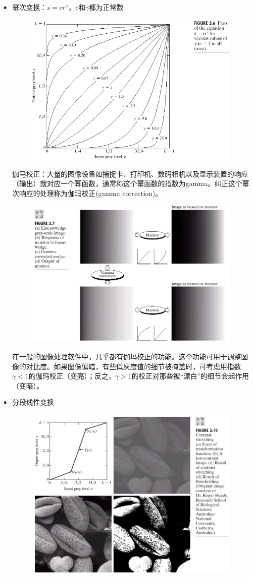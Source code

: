 \begin{itemize}
\begin{figure}[H]
\end{figure}
\item 幂次变换：$s=cr^\gamma$，$c$和$\gamma$都为正常数
\begin{figure}[H]
\centering
\includegraphics[width=0.6\linewidth]{fig/trans-power.png}
\end{figure}
伽马校正：大量的图像设备如捕捉卡、打印机、数码相机以及显示装置的响应（输出）就对应一个幂函数，通常称这个幂函数的指数为gamma。纠正这个幂次响应的处理称为伽玛校正(gamma correction)。
\begin{figure}[H]
\centering
\includegraphics[width=0.6\linewidth]{fig/trans-gamma.png}
\end{figure}
在一般的图像处理软件中，几乎都有伽玛校正的功能。这个功能可用于调整图像的对比度。如果图像偏暗，有些低灰度值的细节被掩盖时，可考虑用指数$\gamma<1$的伽玛校正（变亮）；反之，$\gamma>1$的校正对那些被“漂白”的细节会起作用（变暗）。
\item 分段线性变换
\begin{figure}[H]
\centering
\includegraphics[width=0.6\linewidth]{fig/trans-by-cases.png}

\end{figure}
\end{itemize}
